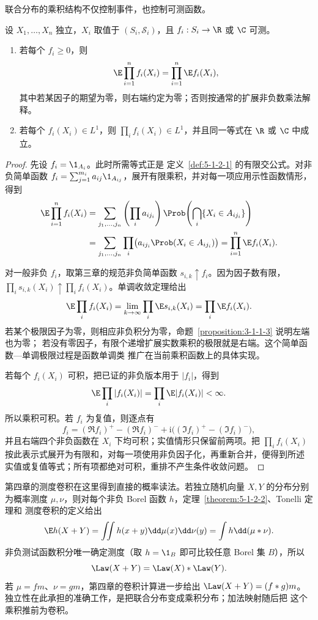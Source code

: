 联合分布的乘积结构不仅控制事件，也控制可测函数。

\begin{theorem}[期望因子化]\label{theorem:5-1-2-3}
设 $X_1,\ldots,X_n$ 独立，$X_i$ 取值于 $(S_i,\mathcal S_i)$，且
$f_i:S_i\to\R$ 或 $\C$ 可测。
\begin{enumerate}[label=\textup{(\roman*)}]
  \item 若每个 $f_i\ge0$，则
  \[
    \E\prod_{i=1}^nf_i(X_i)=\prod_{i=1}^n\E f_i(X_i),
  \]
  其中若某因子的期望为零，则右端约定为零；否则按通常的扩展非负数乘法解释。
  \item 若每个 $f_i(X_i)\in L^1$，则 $\prod_i f_i(X_i)\in L^1$，并且同一等式在
  $\R$ 或 $\C$ 中成立。
\end{enumerate}
\end{theorem}

\begin{proof}
先设 $f_i=\1_{A_i}$。此时所需等式正是
定义~\ref{def:5-1-2-1} 的有限交公式。对非负简单函数
$f_i=\sum_{j=1}^{m_i}a_{ij}\1_{A_{ij}}$，展开有限乘积，并对每一项应用示性函数情形，得到
\begin{align*}
 \E\prod_{i=1}^nf_i(X_i)
 &=\sum_{j_1,\ldots,j_n}
   \left(\prod_i a_{ij_i}\right)
   \Prob\!\left(\bigcap_i\{X_i\in A_{ij_i}\}\right)\\
 &=\sum_{j_1,\ldots,j_n}
   \prod_i\bigl(a_{ij_i}\Prob(X_i\in A_{ij_i})\bigr)
 =\prod_{i=1}^n\E f_i(X_i).
\end{align*}

对一般非负 $f_i$，取第三章的规范非负简单函数 $s_{i,k}\uparrow f_i$。因为因子数有限，
$\prod_i s_{i,k}(X_i)\uparrow\prod_i f_i(X_i)$。单调收敛定理给出
\[
 \E\prod_i f_i(X_i)
 =\lim_{k\to\infty}\prod_i\E s_{i,k}(X_i)
 =\prod_i\E f_i(X_i).
\]
若某个极限因子为零，则相应非负积分为零，命题~\ref{proposition:3-1-1-3} 说明左端也为零；
若没有零因子，有限个递增扩展实数乘积的极限就是右端。这个简单函数—单调极限过程是函数单调类
推广在当前乘积函数上的具体实现。

若每个 $f_i(X_i)$ 可积，把已证的非负版本用于 $|f_i|$，得到
\[
 \E\prod_i|f_i(X_i)|=\prod_i\E|f_i(X_i)|<\infty.
\]
所以乘积可积。若 $f_i$ 为复值，则逐点有
\[
 f_i=(\Re f_i)^+-(\Re f_i)^-
   +\mathrm i\bigl((\Im f_i)^+-(\Im f_i)^-\bigr),
\]
并且右端四个非负函数在 $X_i$ 下均可积；实值情形只保留前两项。把
$\prod_i f_i(X_i)$ 按此表示式展开为有限和，对每一项使用非负因子化，再重新合并，便得到所述
实值或复值等式；所有项都绝对可积，重排不产生条件收敛问题。
\end{proof}

第四章的测度卷积在这里得到直接的概率读法。若独立随机向量 $X,Y$ 的分布分别为概率测度
$\mu,\nu$，则对每个非负 Borel 函数 $h$，定理~\ref{theorem:5-1-2-2}、Tonelli 定理和
测度卷积的定义给出
\[
 \E h(X+Y)
 =\iint h(x+y)\dd\mu(x)\dd\nu(y)
 =\int h\dd(\mu*\nu).
\]
非负测试函数积分唯一确定测度（取 $h=\1_B$ 即可比较任意 Borel 集 $B$），所以
\begin{equation}\label{eq:5-1-2-independent-sum-convolution}
 \Law(X+Y)=\Law(X)*\Law(Y).
\end{equation}
若 $\mu=fm$、$\nu=gm$，第四章的卷积计算进一步给出
$\Law(X+Y)=(f*g)m$。独立性在此承担的准确工作，是把联合分布变成乘积分布；加法映射随后把
这个乘积推前为卷积。

